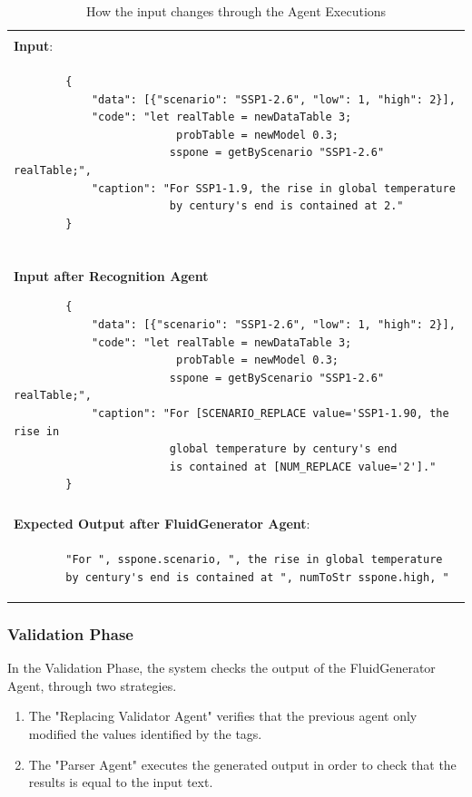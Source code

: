 \begin{table}[!ht]
    \centering
    \caption{How the input changes through the Agent Executions \label{tab:agent_execution_sample}}
    \begin{tabular}{p{13cm}}
    \hline
    \hline
    \\\textbf{Input}:\\
    \begin{verbatim}
        {
            "data": [{"scenario": "SSP1-2.6", "low": 1, "high": 2}],
            "code": "let realTable = newDataTable 3;
                         probTable = newModel 0.3;
                        sspone = getByScenario "SSP1-2.6" realTable;",
            "caption": "For SSP1-1.9, the rise in global temperature
                        by century's end is contained at 2."
        }
    \end{verbatim}
    \\
    \hline
    \\
    \textbf{Input after Recognition Agent}
    \begin{verbatim}
        {
            "data": [{"scenario": "SSP1-2.6", "low": 1, "high": 2}],
            "code": "let realTable = newDataTable 3;
                         probTable = newModel 0.3;
                        sspone = getByScenario "SSP1-2.6" realTable;",
            "caption": "For [SCENARIO_REPLACE value='SSP1-1.90, the rise in
                        global temperature by century's end
                        is contained at [NUM_REPLACE value='2']."
        }
    \end{verbatim}\\
    \hline
    \\\textbf{Expected Output after FluidGenerator Agent}:\\
    \begin{verbatim}
        "For ", sspone.scenario, ", the rise in global temperature
        by century's end is contained at ", numToStr sspone.high, "
    \end{verbatim}

    \\
    \hline
    \hline
    \end{tabular}
\end{table}

\subsubsection{Validation Phase}
In the Validation Phase, the system checks the output of the FluidGenerator Agent, through two strategies.
\begin{enumerate}
    \item The "Replacing Validator Agent" verifies that the previous agent only modified the values identified by the tags.
    \item The "Parser Agent" executes the generated output in order to check that the results is equal to the input text.
\end{enumerate}


